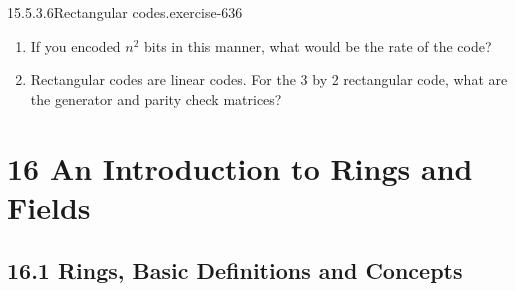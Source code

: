 \documentclass[twoside,10pt,]{book}
\numberwithin{equation}{section}
\begin{document}
\begin{divisionsolution}{15.5.3.6}{Rectangular codes.}{exercise-636}
\begin{enumerate}[label=(\alph*)]
\begin{multicols}{3}
\begin{enumerate}[label=(\roman*)]
\item\hypertarget{li-2505}{}\hypertarget{p-5687}{}%
11011000%
\item\hypertarget{li-2506}{}\hypertarget{p-5688}{}%
01110010%
\item\hypertarget{li-2507}{}\hypertarget{p-5689}{}%
10001111%
\end{enumerate}
\end{multicols}
%
\item\hypertarget{li-2508}{}\hypertarget{p-5690}{}%
If you encoded \(n^2\) bits in this manner, what would be the rate of the code?%
\item\hypertarget{li-2509}{}\hypertarget{p-5691}{}%
Rectangular codes are linear codes.  For the 3 by 2 rectangular code, what are the generator and parity check matrices?%
\end{enumerate}
%
\end{divisionsolution}%
\chapter*{16 An Introduction to Rings and Fields}
\section*{16.1 Rings, Basic Definitions and Concepts}
\end{document}
